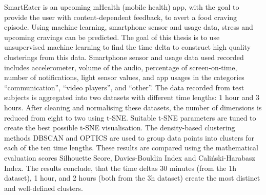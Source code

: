 
SmartEater is an upcoming mHealth (mobile health) app, with the goal to provide the user with content-dependent feedback, to avert a food craving episode. Using machine learning,  smartphone sensor and usage data, stress and upcoming cravings can be predicted. The goal of this thesis is to use unsupervised machine learning to find the time delta to construct high quality clusterings from this data. Smartphone sensor and usage data used recorded includes accelerometer, volume of the audio, percentage of screen-on-time, number of notifications, light sensor values, and app usages in the categories “communication”, “video players”, and “other”. The data recorded from test subjects is aggregated into two datasets with different time lengths: 1 hour and 3 hours. After cleaning and normalising these datasets, the number of dimensions is reduced from eight to two using t-SNE. Suitable t-SNE parameters are tuned to create the best possible t-SNE visualisation. The density-based clustering methods DBSCAN and OPTICS are used to group data points into clusters for each of the ten time lengths. These results are compared using the mathematical evaluation scores Silhouette Score, Davies-Bouldin Index and Caliński-Harabasz Index. The results conclude, that the time deltas 30 minutes (from the 1h dataset), 1 hour, and 2 hours (both from the 3h dataset) create the most distinct and well-defined clusters.

